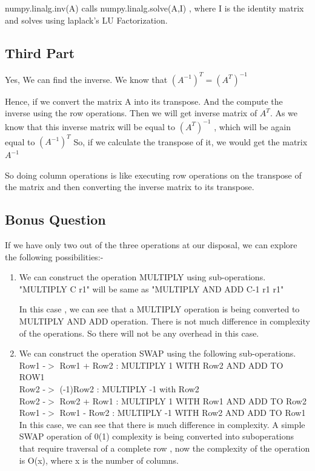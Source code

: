 \documentclass[runningheads]{llncs}
\begin{document}
numpy.linalg.inv(A) calls numpy.linalg.solve(A,I) , where I is the identity matrix and solves using laplack's LU Factorization.~\cite{ref_proc1}

\subsection{Third Part}
Yes, We can find the inverse. We know that $(A^{-1})^T = (A^T)^{-1}$ 

Hence, if we convert the matrix A into its transpose. And the compute the inverse using the row operations. Then we will get inverse matrix of $A^T$.
As we know that this inverse matrix will be equal to $(A^{T})^{-1}$ , which will be again equal to $(A^{-1})^T$
So, if we calculate the transpose of it, we would get the matrix $A^{-1}$

So doing column operations is like executing row operations on the transpose of the matrix and then converting the inverse matrix to its transpose. 


\subsection{Bonus Question}
If we have only two out of the three operations at our disposal, we can explore the following possibilities:-
\begin{enumerate}
\item
We can construct the operation MULTIPLY using sub-operations.\\
"MULTIPLY C r1" will be same as "MULTIPLY AND ADD C-1 r1 r1"

In this case , we can see that a MULTIPLY operation is being converted to MULTIPLY AND ADD operation. There is not much difference in complexity of the operations. So there will not be any overhead in this case. 

\item
We can construct the operation SWAP using the following sub-operations.\\
Row1 -$>$ Row1 + Row2 : MULTIPLY 1 WITH Row2 AND ADD TO ROW1\\
Row2 -$>$ (-1)Row2 : MULTIPLY -1 with Row2 \\
Row2 -$>$ Row2 + Row1 : MULTIPLY 1 WITH Row1 AND ADD TO Row2\\
Row1 -$>$ Row1 - Row2 : MULTIPLY -1 WITH Row2 AND ADD TO Row1\\

In this case, we can see that there is much difference in complexity. A simple SWAP operation of 0(1) complexity is being converted into suboperations that require traversal of a complete row , now the complexity of the operation is O(x), where x is the number of columns. 

\end{enumerate}
\end{document}
